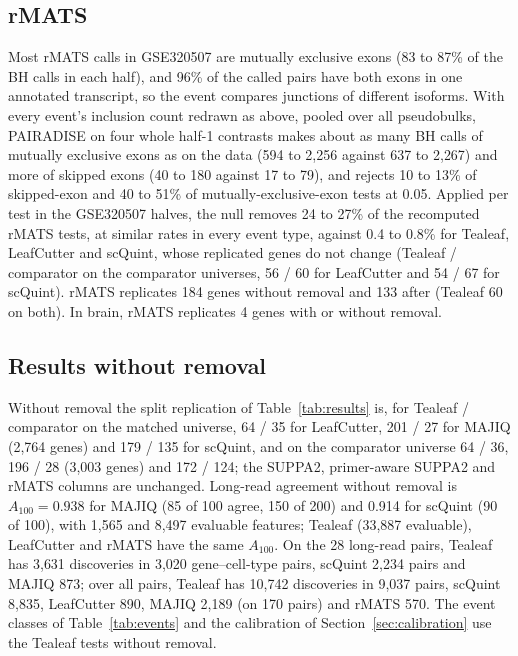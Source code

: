 \documentclass[11pt]{article}
\begin{document}
\subsection{rMATS}

Most rMATS calls in GSE320507 are mutually exclusive exons (83 to 87\% of the BH calls in each half), and 96\% of the called pairs have both exons in one annotated transcript, so the event compares junctions of different isoforms. With every event's inclusion count redrawn as above, pooled over all pseudobulks, PAIRADISE on four whole half-1 contrasts makes about as many BH calls of mutually exclusive exons as on the data (594 to 2{,}256 against 637 to 2{,}267) and more of skipped exons (40 to 180 against 17 to 79), and rejects 10 to 13\% of skipped-exon and 40 to 51\% of mutually-exclusive-exon tests at 0.05. Applied per test in the GSE320507 halves, the null removes 24 to 27\% of the recomputed rMATS tests, at similar rates in every event type, against 0.4 to 0.8\% for Tealeaf, LeafCutter and scQuint, whose replicated genes do not change (Tealeaf / comparator on the comparator universes, 56 / 60 for LeafCutter and 54 / 67 for scQuint). rMATS replicates 184 genes without removal and 133 after (Tealeaf 60 on both). In brain, rMATS replicates 4 genes with or without removal.

\subsection{Results without removal}

Without removal the split replication of Table~\ref{tab:results} is, for Tealeaf / comparator on the matched universe, 64 / 35 for LeafCutter, 201 / 27 for MAJIQ (2{,}764 genes) and 179 / 135 for scQuint, and on the comparator universe 64 / 36, 196 / 28 (3{,}003 genes) and 172 / 124; the SUPPA2, primer-aware SUPPA2 and rMATS columns are unchanged. Long-read agreement without removal is $A_{100}=0.938$ for MAJIQ (85 of 100 agree, 150 of 200) and 0.914 for scQuint (90 of 100), with 1{,}565 and 8{,}497 evaluable features; Tealeaf (33{,}887 evaluable), LeafCutter and rMATS have the same $A_{100}$. On the 28 long-read pairs, Tealeaf has 3{,}631 discoveries in 3{,}020 gene--cell-type pairs, scQuint 2{,}234 pairs and MAJIQ 873; over all pairs, Tealeaf has 10{,}742 discoveries in 9{,}037 pairs, scQuint 8{,}835, LeafCutter 890, MAJIQ 2{,}189 (on 170 pairs) and rMATS 570. The event classes of Table~\ref{tab:events} and the calibration of Section~\ref{sec:calibration} use the Tealeaf tests without removal.
\end{document}
